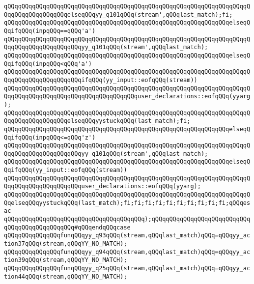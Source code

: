 \verb|qQQqqQQqqQQqqQQqqQQqqQQqqQQqqQQqqQQqqQQqqQQqqQQqqQQqqQQqqQQqqQQqqQQqqQQqqQQqqQQqqQQqqQQqelseqQQqyy_q101qQQq(stream',qQQqlast_match);fi;|\newline
\verb|qQQqqQQqqQQqqQQqqQQqqQQqqQQqqQQqqQQqqQQqqQQqqQQqqQQqqQQqqQQqqQQqelseqQQqifqQQq(inpqQQq==qQQq'a')|\newline
\verb|qQQqqQQqqQQqqQQqqQQqqQQqqQQqqQQqqQQqqQQqqQQqqQQqqQQqqQQqqQQqqQQqqQQqqQQqqQQqqQQqqQQqqQQqqQQqyy_q101qQQq(stream',qQQqlast_match);|\newline
\verb|qQQqqQQqqQQqqQQqqQQqqQQqqQQqqQQqqQQqqQQqqQQqqQQqqQQqqQQqqQQqqQQqelseqQQqifqQQq(inpqQQq<qQQq'a')|\newline
\verb|qQQqqQQqqQQqqQQqqQQqqQQqqQQqqQQqqQQqqQQqqQQqqQQqqQQqqQQqqQQqqQQqqQQqqQQqqQQqqQQqqQQqqQQqqQQqifqQQq(yy_input::eofqQQq(stream))|\newline
\verb|qQQqqQQqqQQqqQQqqQQqqQQqqQQqqQQqqQQqqQQqqQQqqQQqqQQqqQQqqQQqqQQqqQQqqQQqqQQqqQQqqQQqqQQqqQQqqQQqqQQqqQQqqQQquser_declarations::eofqQQq(yyarg);|\newline
\verb|qQQqqQQqqQQqqQQqqQQqqQQqqQQqqQQqqQQqqQQqqQQqqQQqqQQqqQQqqQQqqQQqqQQqqQQqqQQqqQQqqQQqqQQqelseqQQqyystuckqQQq(last_match);fi;|\newline
\verb|qQQqqQQqqQQqqQQqqQQqqQQqqQQqqQQqqQQqqQQqqQQqqQQqqQQqqQQqqQQqqQQqelseqQQqifqQQq(inpqQQq<=qQQq'z')|\newline
\verb|qQQqqQQqqQQqqQQqqQQqqQQqqQQqqQQqqQQqqQQqqQQqqQQqqQQqqQQqqQQqqQQqqQQqqQQqqQQqqQQqqQQqqQQqqQQqyy_q101qQQq(stream',qQQqlast_match);|\newline
\verb|qQQqqQQqqQQqqQQqqQQqqQQqqQQqqQQqqQQqqQQqqQQqqQQqqQQqqQQqqQQqqQQqelseqQQqifqQQq(yy_input::eofqQQq(stream))|\newline
\verb|qQQqqQQqqQQqqQQqqQQqqQQqqQQqqQQqqQQqqQQqqQQqqQQqqQQqqQQqqQQqqQQqqQQqqQQqqQQqqQQqqQQqqQQqqQQquser_declarations::eofqQQq(yyarg);|\newline
\verb|qQQqqQQqqQQqqQQqqQQqqQQqqQQqqQQqqQQqqQQqqQQqqQQqqQQqqQQqqQQqqQQqqQQqqQQqelseqQQqyystuckqQQq(last_match);fi;fi;fi;fi;fi;fi;fi;fi;fi;fi;qQQqesac|\newline
\verb|qQQqqQQqqQQqqQQqqQQqqQQqqQQqqQQqqQQqqQQq);qQQqqQQqqQQqqQQqqQQqqQQqqQQqqQQqqQQqqQQqqQQqqQQq#qQQqendqQQqcase|\newline
\verb|qQQqqQQqqQQqqQQqfunqQQqyy_q93qQQq(stream,qQQqlast_match)qQQq=qQQqyy_action37qQQq(stream,qQQqYY_NO_MATCH);|\newline
\verb|qQQqqQQqqQQqqQQqfunqQQqyy_q94qQQq(stream,qQQqlast_match)qQQq=qQQqyy_action39qQQq(stream,qQQqYY_NO_MATCH);|\newline
\verb|qQQqqQQqqQQqqQQqfunqQQqyy_q25qQQq(stream,qQQqlast_match)qQQq=qQQqyy_action44qQQq(stream,qQQqYY_NO_MATCH);|\newline
